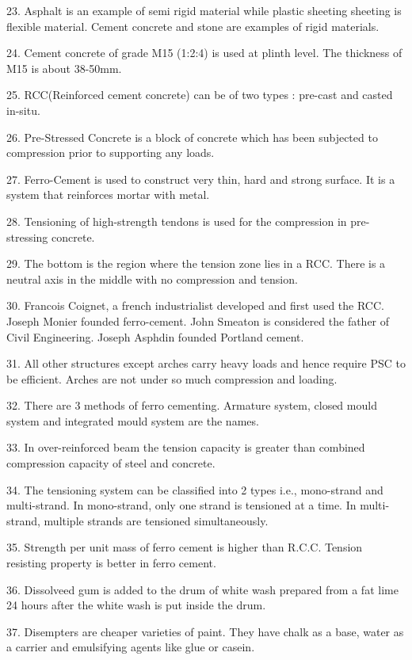 \documentclass[11pt,a4paper]{article}
\begin{document}
23.
Asphalt is an example of semi rigid material while plastic sheeting sheeting is flexible material. Cement concrete and stone are examples of rigid materials.

24.
Cement concrete of grade M15 (1:2:4) is used at plinth level. The thickness of M15 is about 38-50mm.

25.
RCC(Reinforced cement concrete) can be of two types : pre-cast and casted in-situ.

26.
Pre-Stressed Concrete is a block of concrete which has been subjected to compression prior to supporting any loads.

27.
Ferro-Cement is used to construct very thin, hard and strong surface. It is a system that reinforces mortar with metal.

28.
Tensioning of high-strength tendons is used for the compression in pre-stressing concrete.

29.
The bottom is the region where the tension zone lies in a RCC. There is a neutral axis in the middle with no compression and tension.

30.
Francois Coignet, a french industrialist developed and first used the RCC. Joseph Monier founded ferro-cement. John Smeaton is considered the father of Civil Engineering. Joseph Asphdin founded Portland cement.

31.
All other structures except arches carry heavy loads and hence require PSC to be efficient. Arches are not under so much compression and loading.

32.
There are 3 methods of ferro cementing. Armature system, closed mould system and integrated mould system are the names.

33.
In over-reinforced beam the tension capacity is greater than combined compression capacity of steel and concrete.

34.
The tensioning system can be classified into 2 types i.e., mono-strand and multi-strand. In mono-strand, only one strand is tensioned at a time. In multi-strand, multiple strands are tensioned simultaneously.

35.
Strength per unit mass of ferro cement is higher than R.C.C. Tension resisting property is better in ferro cement.

36.
Dissolveed gum is added to the drum of white wash prepared from a fat lime 24 hours after the white wash is put inside the drum.

37.
Disempters are cheaper varieties of paint. They have chalk as a base, water as a carrier and emulsifying agents like glue or casein.
\end{document}
